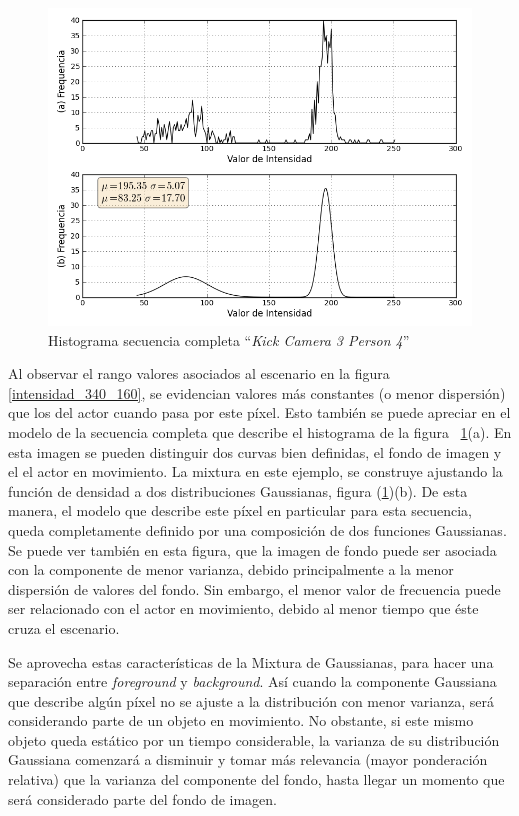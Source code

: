 \begin{figure}[h!]
  \centering
      \includegraphics[scale=0.75]{img/ch3/histograma_pixel_340_160_3_2}
  \caption[Histograma secuencia completa ``\textit{Kick Camera 3 Person 4}'']{Histograma secuencia completa ``\textit{Kick Camera 3 Person 4}''}
\label{histograma}
\end{figure}

Al observar el rango valores asociados al escenario en la figura \ref{intensidad_340_160}, se evidencian valores más constantes (o menor dispersión) que los del actor cuando pasa por este píxel. Esto también se puede apreciar en el modelo de la secuencia completa que describe el histograma de la figura ~\ref{histograma}(a). En esta imagen se pueden distinguir dos curvas bien definidas, el fondo de imagen y el el actor en movimiento. La mixtura en este ejemplo, se construye ajustando la función de densidad a dos distribuciones Gaussianas, figura (\ref{histograma})(b). De esta manera, el modelo que describe este píxel en particular para esta secuencia, queda completamente definido por una composición de dos funciones Gaussianas. Se puede ver también en esta figura, que la imagen de fondo puede ser asociada con la componente de menor varianza, debido principalmente a la menor dispersión de valores del fondo. Sin embargo, el menor valor de frecuencia puede ser relacionado con el actor en movimiento, debido al menor tiempo que éste cruza el escenario. 

Se aprovecha estas características de la Mixtura de Gaussianas, para hacer una separación entre \textit{foreground} y \textit{background}. Así cuando la componente Gaussiana que describe algún píxel no se ajuste a la distribución con menor varianza, será considerando parte de un objeto en movimiento. No obstante, si este mismo objeto queda estático por un tiempo considerable, la varianza de su distribución Gaussiana comenzará a disminuir y tomar más relevancia (mayor ponderación relativa) que la varianza del componente del fondo, hasta llegar un momento que será considerado parte del fondo de imagen.





